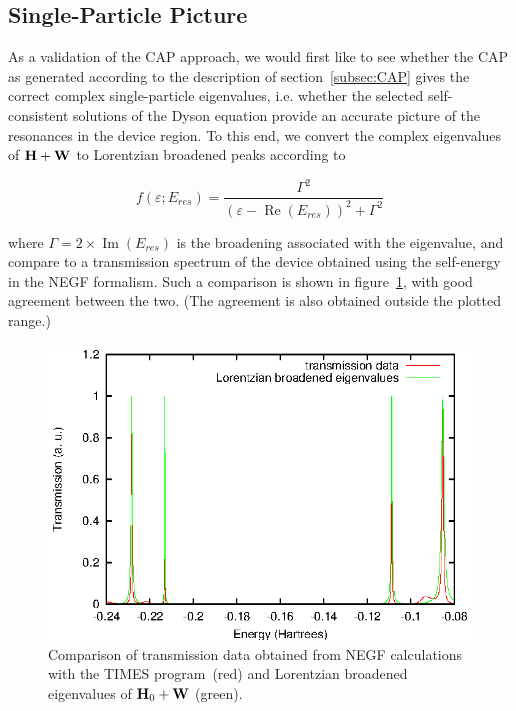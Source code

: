 \subsection{Single-Particle Picture}
\label{subsec:SingleParticle}

As a validation of the CAP approach, we would first like to see whether the
CAP as generated according to the description of section~\ref{subsec:CAP} gives
the correct complex single-particle eigenvalues, i.e. whether the selected
self-consistent solutions of the Dyson equation provide an accurate picture of
the resonances in the device region. To this end, we convert the complex
eigenvalues of $\mathbf{H} + \mathbf{W}$ to Lorentzian broadened peaks according to

\begin{equation}
	f(\varepsilon;E_{res})
	= \frac{\Gamma^2}{(\varepsilon - \operatorname{Re}(E_{res}))^2 + \Gamma^2}
	\label{eq:lobro}
\end{equation}

where $\Gamma = 2 \times \operatorname{Im}(E_{res})$ is the broadening
associated with the eigenvalue, and compare to a transmission spectrum of the
device obtained using the self-energy in the NEGF formalism. Such a comparison
is shown in figure~\ref{fig:lobro-hwevals}, with good agreement between the
two. (The agreement is also obtained outside the plotted range.)

\begin{figure}
	\begin{center}
		\includegraphics[width=0.9\linewidth]{figures/4evals}
	\end{center}
	\caption{Comparison of transmission data obtained from NEGF
	calculations with the TIMES program~\cite{times}(red) and Lorentzian
	broadened eigenvalues of $\mathbf{H}_0 + \mathbf{W}$ (green).}
	\label{fig:lobro-hwevals}
\end{figure}

